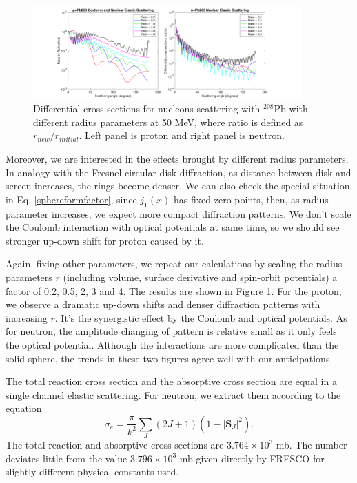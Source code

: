     \begin{figure}[t]
		\centering
		\includegraphics[width=0.92\textwidth]{7.png}
		\caption{Differential cross sections for nucleons scattering with $^{208}$Pb with different radius parameters at 50 MeV, where ratio is defined as $r_{new}/r_{initial}$. Left panel is proton and right panel is neutron.  }
		\label{fig:radiusparameter}
	\end{figure}

	Moreover, we are interested in the effects brought by different radius parameters. 
	In analogy with the Fresnel circular disk diffraction, as distance between disk and screen increases, the rings become denser.
	We can also check the special situation in Eq. \ref{sphereformfactor}, since $j_1(x)$ has fixed zero points, then, as radius parameter increases, we expect more compact diffraction patterns. 
	We don't scale the Coulomb interaction with optical potentials at same time, so we should see stronger up-down shift for proton caused by it.
	
	Again, fixing other parameters, we repeat our calculations by scaling the radius parameters $r$ (including volume, surface derivative and spin-orbit potentials) a factor of 0.2, 0.5, 2, 3 and 4. 
	The results are shown in Figure \ref{fig:radiusparameter}.
	For the proton, we observe a dramatic up-down shifts and denser diffraction patterns with increasing $r$. 
	It's the synergistic effect by the Coulomb and optical potentials. 
	As for neutron, the amplitude changing of pattern is relative small as it only feels the optical potential. 
	Although the interactions are more complicated than the solid sphere, the trends in these two figures agree well with our anticipations.
	
	The total reaction cross section and the absorptive cross section are equal in a single channel elastic scattering. For neutron, we extract them according to the equation
	\begin{equation}
		\sigma_{e}=\frac{\pi}{k^2}\sum_{J}(2J+1)(1-|\mathbf{S}_J|^2).
			\end{equation}
	The total reaction and absorptive cross sections are $3.764\times 10^3$ mb. The number deviates little from the value $3.796\times 10^3$ mb given directly by FRESCO for slightly different physical constants used.
	
